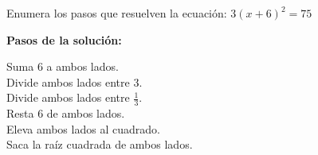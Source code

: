 Enumera los pasos que resuelven la ecuación: $3(x+6)^2=75$

\textbf{Pasos de la solución:}

\fillin[-][0.5cm] Suma $6$ a ambos lados.\\
\fillin[1][0.5cm] Divide ambos lados entre $3$.\\
\fillin[-][0.5cm] Divide ambos lados entre $\frac{1}{3}$.\\
\fillin[3][0.5cm] Resta $6$ de ambos lados.\\
\fillin[-][0.5cm] Eleva ambos lados al cuadrado.\\
\fillin[2][0.5cm] Saca la raíz cuadrada de ambos lados.\\
